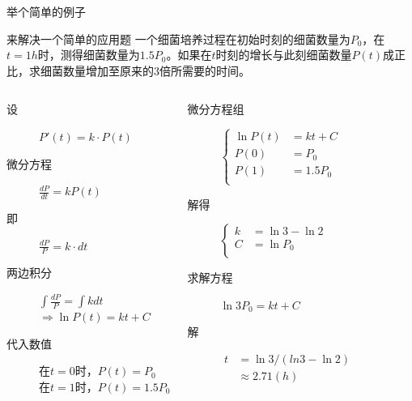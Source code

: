 \documentclass{beamer}
\begin{document}
\begin{frame}{举个简单的例子}
\begin{exampleblock}{来解决一个简单的应用题}
一个细菌培养过程在初始时刻的细菌数量为$P_0$，在$t=1h$时，测得细菌数量为$1.5P_0$。如果在$t$时刻的增长与此刻细菌数量$P(t)$成正比，求细菌数量增加至原来的3倍所需要的时间。
\end{exampleblock}

\begin{columns}
\begin{description}
 \item[设] $P'(t) = k \cdot P(t)$ 
 \item[微分方程] $\frac{{dP}}{{dt}} = kP(t)$
 \item[即]  $\frac{{dP}}{{P}} = k \cdot dt$
 \item[两边积分] $\int {\frac{{dP}}{P} = \int {kdt} } $\\
 $ \Rightarrow \ln P(t) = kt + C$
 \item[代入数值] 在$t=0$时，$P(t)=P_0$\\
 在$t=1$时，$P(t)=1.5P_0$
\end{description}
\begin{description}
	 \item[微分方程组] $
	 \left\{
	 \begin{aligned}
	 \ln P(t) &= kt + C \\
	 P(0)&=P_0 \\
	 P(1)&=1.5P_0 \\
	 \end{aligned}
	 \right.
	 $
	 \item[解得] $
	 \left\{
	 \begin{aligned}
	 k&=\ln 3-\ln 2 \\
	 C&=\ln P_0 \\
	 \end{aligned}
	 \right.
	 $
	 \item[求解方程] $\ln 3P_0 = kt + C$
	 \item[解] $ 
	 \begin{aligned}
	 t&=\ln 3/(ln3 - \ln 2) \\
	  & \approx 2.71 (h)
	 \end{aligned}$
\end{description}
\end{columns}
\end{frame}
\end{document}
